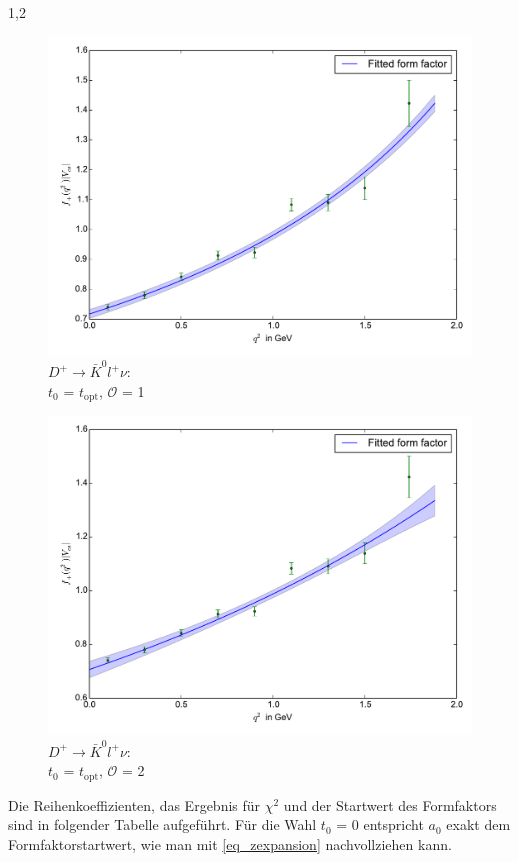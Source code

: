 \documentclass[11pt,a4paper,twoside,draft]{report}
\begin{document}
\begin{spacing}{1,2}
 \begin{minipage}[H]{0.45\textwidth}
 \begin{figure}[H]
 \includegraphics[width=1\textwidth]{Fit/D+-1Ord-t0.pdf}
 \caption{$D^+\rightarrow \bar K^0 l^+ \nu$: \\$t_0$ = $t_{\text{opt}}$, $\mathcal{O}$ = 1}
 \vspace{0.5cm}
 \label{pic_D+-1Ord-t0}
 \end{figure}
 \end{minipage}
 \hfill
 \begin{minipage}[H]{0.45\textwidth}
 \begin{figure}[H]
 \includegraphics[width=1\textwidth]{Fit/D+-2Ord-t0.pdf}
 \caption{$D^+\rightarrow \bar K^0 l^+ \nu$: \\$t_0$ = $t_{\text{opt}}$, $\mathcal{O}$ = 2}
 \vspace{0.5cm}
 \label{pic_D+-2Ord-t0}
 \end{figure}
 \end{minipage}
{}
Die Reihenkoeffizienten, das Ergebnis für $\chi^2$ und der Startwert des Formfaktors sind in folgender Tabelle aufgeführt. Für die Wahl $t_0$ = 0 entspricht
$a_0$ exakt dem Formfaktorstartwert, wie man mit \eqref{eq_zexpansion} nachvollziehen kann.


\end{spacing}
\end{document}
